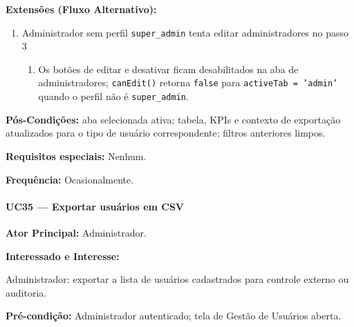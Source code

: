 \textbf{Extensões (Fluxo Alternativo):}

\begin{enumerate}
  \renewcommand{\theenumi}{3a}
  \renewcommand{\labelenumi}{\theenumi.}
  \item Administrador sem perfil \texttt{super\_admin}
        tenta editar administradores no passo 3
  \begin{enumerate}
  \item Os botões de editar e desativar ficam
        desabilitados na aba de administradores;
        \texttt{canEdit()} retorna \texttt{false}
        para \texttt{activeTab = 'admin'} quando
        o perfil não é \texttt{super\_admin}.
  \end{enumerate}
\end{enumerate}

\textbf{Pós-Condições:} aba selecionada ativa; tabela,
KPIs e contexto de exportação atualizados para o tipo
de usuário correspondente; filtros anteriores limpos.

\textbf{Requisitos especiais:} Nenhum.

\textbf{Frequência:} Ocasionalmente.

\paragraph{UC35 --- Exportar usuários em CSV}\hfill\break

\textbf{Ator Principal:} Administrador.

\textbf{Interessado e Interesse:}

Administrador: exportar a lista de usuários cadastrados
para controle externo ou auditoria.

\textbf{Pré-condição:} Administrador autenticado; tela de
Gestão de Usuários aberta.

